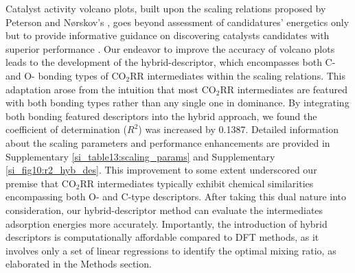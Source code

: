 Catalyst activity volcano plots, built upon the scaling relations proposed by Peterson and Nørskov's \cite{peterson2012activity},
goes beyond assessment of candidatures' energetics only but to provide informative guidance on discovering catalysts candidates with superior performance \cite{balandin1969modern, deutschmann2000heterogeneous}.
Our endeavor to improve the accuracy of volcano plots leads to the development of the hybrid-descriptor,
which encompasses both C- and O- bonding types of CO$_2$RR intermediates within the scaling relations.
This adaptation arose from the intuition that most CO$_2$RR intermediates are featured with both bonding types rather than any single one in dominance.
By integrating both bonding featured descriptors into the hybrid approach, we found the coefficient of determination ($R^2$) was increased by 0.1387.
Detailed information about the scaling parameters and performance enhancements are provided in Supplementary \cref{si_table13:scaling_params} and Supplementary \cref{si_fig10:r2_hyb_des}.
This improvement to some extent underscored our premise that CO$_2$RR intermediates typically exhibit chemical similarities encompassing both O- and C-type descriptors.
After taking this dual nature into consideration, our hybrid-descriptor method can evaluate the intermediates adsorption energies more accurately.
Importantly, the introduction of hybrid descriptors is computationally affordable compared to DFT methods,
as it involves only a set of linear regressions to identify the optimal mixing ratio, as elaborated in the Methods section.

